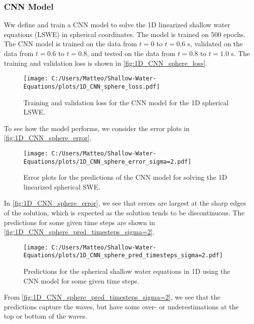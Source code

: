 \subsubsection*{CNN Model}
Ww define and train a CNN model to solve the 1D linearized shallow water equations (LSWE) in spherical coordinates.
The model is trained on $500$ epochs.
The CNN model is trained on the data from $t = 0$ to $t = 0.6$ s, validated on the data from $t = 0.6$ to $t = 0.8$, and tested on the data from $t = 0.8$ to $t = 1.0$ s.
The training and validation loss is shown in \autoref{fig:1D_CNN_sphere_loss}.
\begin{figure}[H]
    \centering
    \texttt{[image: C:/Users/Matteo/Shallow-Water-Equations/plots/1D\_CNN\_sphere\_loss.pdf]}
    \caption{Training and validation loss for the CNN model for the 1D spherical LSWE.}\label{fig:1D_CNN_sphere_loss}
\end{figure}
To see how the model performs, we consider the error plots in \autoref{fig:1D_CNN_sphere_error}.
\begin{figure}[H]
    \centering
    \texttt{[image: C:/Users/Matteo/Shallow-Water-Equations/plots/1D\_CNN\_sphere\_error\_sigma=2.pdf]}
    \caption{Error plots for the predictions of the CNN model for solving the 1D linearized spherical SWE.}\label{fig:1D_CNN_sphere_error}
\end{figure}
In \autoref{fig:1D_CNN_sphere_error}, we see that errors are largest at the sharp edges of the solution, which is expected as the solution tends to be discontinuous.
The predictions for some given time steps are shown in \autoref{fig:1D_CNN_sphere_pred_timesteps_sigma=2}.
\begin{figure}[H]
    \centering
    \texttt{[image: C:/Users/Matteo/Shallow-Water-Equations/plots/1D\_CNN\_sphere\_pred\_timesteps\_sigma=2.pdf]}
    \caption{Predictions for the spherical shallow water equations in 1D using the CNN model for some given time steps.}\label{fig:1D_CNN_sphere_pred_timesteps_sigma=2}
\end{figure}
From \autoref{fig:1D_CNN_sphere_pred_timesteps_sigma=2}, we see that the predictions capture the waves, but have some over- or underestimations at the top or bottom of the waves.

